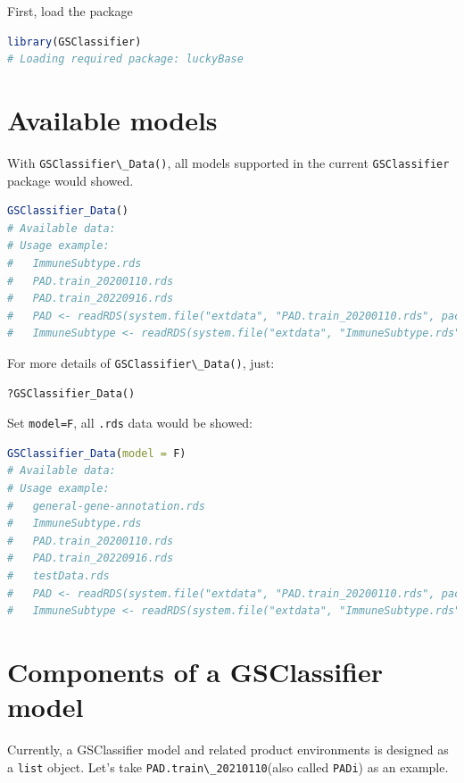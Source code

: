 \documentclass[
  12pt,
]{book}
\newcommand{\passthrough}[1]{#1}
\begin{document}
First, load the package

\begin{lstlisting}[language=R]
library(GSClassifier)
# Loading required package: luckyBase
\end{lstlisting}

\hypertarget{available-models}{%
\section{Available models}\label{available-models}}

With \passthrough{\lstinline!GSClassifier\_Data()!}, all models supported in the current \passthrough{\lstinline!GSClassifier!} package would showed.

\begin{lstlisting}[language=R]
GSClassifier_Data()
# Available data:
# Usage example:
#   ImmuneSubtype.rds 
#   PAD.train_20200110.rds 
#   PAD.train_20220916.rds 
#   PAD <- readRDS(system.file("extdata", "PAD.train_20200110.rds", package = "GSClassifier")) 
#   ImmuneSubtype <- readRDS(system.file("extdata", "ImmuneSubtype.rds", package = "GSClassifier"))
\end{lstlisting}

For more details of \passthrough{\lstinline!GSClassifier\_Data()!}, just:

\begin{lstlisting}
?GSClassifier_Data()
\end{lstlisting}

Set \passthrough{\lstinline!model=F!}, all \passthrough{\lstinline!.rds!} data would be showed:

\begin{lstlisting}[language=R]
GSClassifier_Data(model = F)
# Available data:
# Usage example:
#   general-gene-annotation.rds 
#   ImmuneSubtype.rds 
#   PAD.train_20200110.rds 
#   PAD.train_20220916.rds 
#   testData.rds 
#   PAD <- readRDS(system.file("extdata", "PAD.train_20200110.rds", package = "GSClassifier")) 
#   ImmuneSubtype <- readRDS(system.file("extdata", "ImmuneSubtype.rds", package = "GSClassifier"))
\end{lstlisting}

\hypertarget{components-of-a-gsclassifier-model}{%
\section{Components of a GSClassifier model}\label{components-of-a-gsclassifier-model}}

Currently, a GSClassifier model and related product environments is designed as a \passthrough{\lstinline!list!} object. Let's take \passthrough{\lstinline!PAD.train\_20210110!}(also called \passthrough{\lstinline!PADi!}) as an example.
\end{document}
